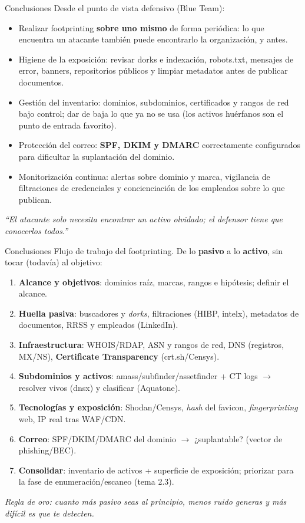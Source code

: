 \documentclass[aspectratio=169,11pt]{beamer}
\begin{document}
\begin{frame}{Conclusiones}
\footnotesize
Desde el punto de vista defensivo (Blue Team):
  \begin{itemize}
  \item Realizar footprinting \textbf{sobre uno mismo} de forma periódica: lo que encuentra un atacante también puede encontrarlo la organización, y antes.
  \item Higiene de la exposición: revisar dorks e indexación, robots.txt, mensajes de error, banners, repositorios públicos y limpiar metadatos antes de publicar documentos.
  \item Gestión del inventario: dominios, subdominios, certificados y rangos de red bajo control; dar de baja lo que ya no se usa (los activos huérfanos son el punto de entrada favorito).
  \item Protección del correo: \textbf{SPF, DKIM y DMARC} correctamente configurados para dificultar la suplantación del dominio.
  \item Monitorización continua: alertas sobre dominio y marca, vigilancia de filtraciones de credenciales y concienciación de los empleados sobre lo que publican.
  \end{itemize}
\vfill
\centering\textit{``El atacante solo necesita encontrar un activo olvidado; el defensor tiene que conocerlos todos.''}
\end{frame}



\begin{frame}[allowframebreaks]{Conclusiones}
\small
Flujo de trabajo del footprinting. De lo \textbf{pasivo} a lo \textbf{activo}, sin tocar (todavía) al objetivo:
  \begin{enumerate}
  \item \textbf{Alcance y objetivos}: dominios raíz, marcas, rangos e hipótesis; definir el alcance.
  \item \textbf{Huella pasiva}: buscadores y \emph{dorks}, filtraciones (HIBP, intelx), metadatos de documentos, RRSS y empleados (LinkedIn).
  \item \textbf{Infraestructura}: WHOIS/RDAP, ASN y rangos de red, DNS (registros, MX/NS), \textbf{Certificate Transparency} (crt.sh/Censys).
  \item \textbf{Subdominios y activos}: amass/subfinder/assetfinder + CT logs $\rightarrow$ resolver vivos (dnsx) y clasificar (Aquatone).
  \item \textbf{Tecnologías y exposición}: Shodan/Censys, \emph{hash} del favicon, \emph{fingerprinting} web, IP real tras WAF/CDN.
  \item \textbf{Correo}: SPF/DKIM/DMARC del dominio $\rightarrow$ ¿suplantable? (vector de phishing/BEC).
  \item \textbf{Consolidar}: inventario de activos + superficie de exposición; priorizar para la fase de enumeración/escaneo (tema 2.3).
  \end{enumerate}
\vfill
\footnotesize\textit{Regla de oro: cuanto más pasivo seas al principio, menos ruido generas y más difícil es que te detecten.}
\end{frame}
\end{document}
